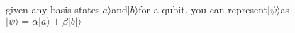 \documentclass[preview]{standalone}
\begin{document}
\begin{center}
given any basis states$|a\rangle$and$|b\rangle$for a qubit, you can represent$|\psi\rangle$as$|\psi\rangle=\alpha|a\rangle+\beta|b|\rangle$
\end{center}
\end{document}

